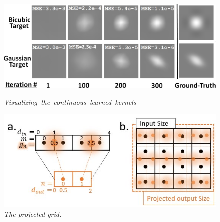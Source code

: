 \begin{figure}
    \centering
    \hspace{-3cm}
    \begin{minipage}{.5\textwidth}
      \centering
      \hspace{1cm}
      \includegraphics[width=1\textwidth]{figs/fig_visualize_Michal.jpg}
      \caption{\mbox{\it Visualizing the continuous learned kernels}}
      \label{fig:visualize}
    \end{minipage}
    \begin{minipage}{.4\textwidth}
        \vspace{-0cm}
        \includegraphics[width=1.5\textwidth]{figs/fig_grid.jpg}
        \begin{minipage}{1.5\textwidth}
            \caption{{\it The projected grid.}}
            \label{fig:grid}
         \end{minipage}%
    \end{minipage}%
    \vspace*{-0.5cm}
\end{figure}



